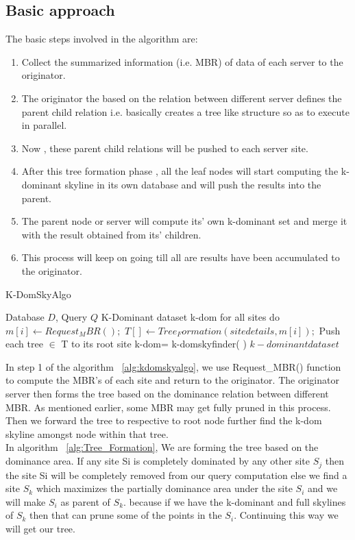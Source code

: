 \documentclass[twocolumn]{article}
\begin{document}
\subsection{Basic approach}
\label{basicapproach}
The basic steps involved in the algorithm are:
\begin{enumerate}
\item Collect the summarized   information (i.e. MBR) of data of each server to the originator.
\item The originator the based on  the relation between different     server defines the parent         child relation i.e. basically     creates a tree like structure     so as to execute in parallel.
\item Now , these parent child          relations will be pushed to       each server site.
\item	After this tree formation         phase , all the leaf nodes        will start computing the          k-dominant skyline in its own     database and will push the        results into the parent.
\item	The parent node or server will     compute its’ own k-dominant       set and merge it with the         result obtained from its’         children.
\item This process will keep on         going till all are results        have been accumulated to the      originator.
\end{enumerate}
\begin{algorithm}
	\caption{K-DomSkyAlgo}
	\label{alg:kdomskyalgo}
	\begin{algorithmic}[1]
		\Require Database $D$, Query $Q$
		\Ensure K-Dominant dataset k-dom
		\State for all sites do $m[i] \gets Request_MBR();$
		\State $T[]\gets Tree_Formation(sitedetails,m[i] );$
		\State Push each tree \(\in\) T to its root site
		\State k-dom= k-domskyfinder( )
		\State \Return $k-dominant dataset$
	\end{algorithmic}
\end{algorithm}
In step 1 of the algorithm ~\ref{alg:kdomskyalgo}, we use Request\_MBR() function to compute the MBR’s of each site and return to the originator. The originator server then forms the tree based on the dominance relation between different MBR. As mentioned earlier, some MBR may get fully pruned in this process. Then we forward the tree to respective to root node further find the k-dom skyline amongst node within that tree.
\\
In algorithm ~\ref{alg:Tree_Formation}, We are forming the tree based on the dominance area. If any site Si is completely dominated by any other site \(S_j\) then the site Si will be completely removed from our query computation else we find a site \(S_k\) which maximizes the partially dominance area under the site \(S_i\) and we will make \(S_i\) as parent of \(S_k\). because if we have the k-dominant and full skylines of \(S_k\) then that can prune some of the points in the \(S_i\). Continuing this way we will get our tree.
\end{document}
